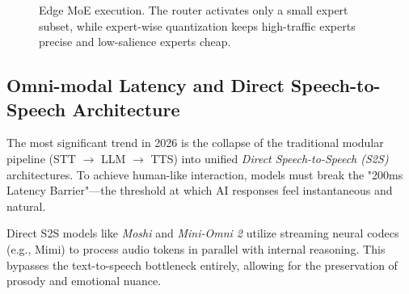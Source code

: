 \documentclass[twocolumn,10pt]{article}
\begin{document}
\begin{figure}[t]
\centering
{}
\caption{Edge MoE execution. The router activates only a small expert subset, while expert-wise quantization keeps high-traffic experts precise and low-salience experts cheap.}
\label{fig:moe_router}
\end{figure}

\subsection{Omni-modal Latency and Direct Speech-to-Speech Architecture}
The most significant trend in 2026 is the collapse of the traditional modular pipeline (STT $\to$ LLM $\to$ TTS) into unified \textit{Direct Speech-to-Speech (S2S)} architectures. To achieve human-like interaction, models must break the "200ms Latency Barrier"—the threshold at which AI responses feel instantaneous and natural.

Direct S2S models like \textit{Moshi} \cite{moshi2024} and \textit{Mini-Omni 2} utilize streaming neural codecs (e.g., Mimi) to process audio tokens in parallel with internal reasoning. This bypasses the text-to-speech bottleneck entirely, allowing for the preservation of prosody and emotional nuance. 
\end{document}
